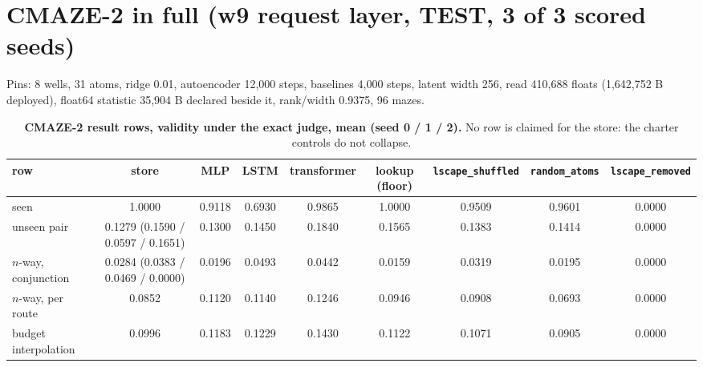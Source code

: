 \documentclass{article} %
\begin{document}
\section{CMAZE-2 in full (w9 request layer, TEST, 3 of 3 scored seeds)}
\label{app:cmaze2}

Pins: 8 wells, 31 atoms, ridge 0.01, autoencoder 12,000 steps, baselines 4,000 steps, latent width
256, read 410,688 floats (1,642,752 B deployed), float64 statistic 35,904 B declared beside it,
rank/width 0.9375, 96 mazes. %

\begin{table}[h]
\centering\scriptsize
\caption{\textbf{CMAZE-2 result rows, validity under the exact judge, mean (seed 0 / 1 / 2).} No
row is claimed for the store: the charter controls do not collapse.}
\label{tab:cmaze2}
\setlength{\tabcolsep}{1.8pt}
\begin{adjustbox}{max width=\linewidth}\begin{tabular}{lcccccccc}
\toprule
row & store & MLP & LSTM & transformer & lookup (floor) & \texttt{lscape\_shuffled} & \texttt{random\_atoms} & \texttt{lscape\_removed} \\
\midrule
seen & 1.0000 & 0.9118 & 0.6930 & 0.9865 & 1.0000 & 0.9509 & 0.9601 & 0.0000 \\
unseen pair & 0.1279 (0.1590 / 0.0597 / 0.1651) & 0.1300 & 0.1450 & 0.1840 & 0.1565 & 0.1383 & 0.1414 & 0.0000 \\
$n$-way, conjunction & 0.0284 (0.0383 / 0.0469 / 0.0000) & 0.0196 & 0.0493 & 0.0442 & 0.0159 & 0.0319 & 0.0195 & 0.0000 \\
$n$-way, per route & 0.0852 & 0.1120 & 0.1140 & 0.1246 & 0.0946 & 0.0908 & 0.0693 & 0.0000 \\
budget interpolation & 0.0996 & 0.1183 & 0.1229 & 0.1430 & 0.1122 & 0.1071 & 0.0905 & 0.0000 \\
\bottomrule
\end{tabular}\end{adjustbox}
\end{table}
\end{document}
